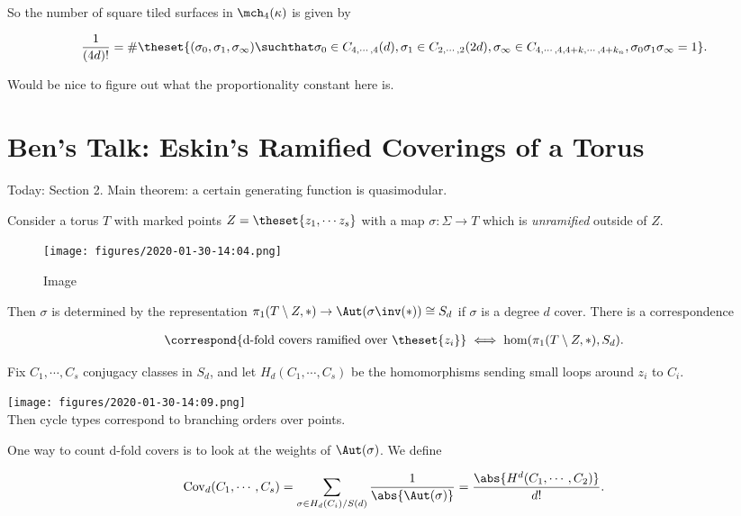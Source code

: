 So the number of square tiled surfaces in \(\mch_4(\kappa)\) is given by

\begin{align*}
\frac{1}{(4d)!} = \# \theset{ (\sigma_0, \sigma_1, \sigma_\infty) \suchthat \sigma_0 \in C_{4, \cdots, 4} (d), \sigma_1 \in C_{2, \cdots ,2} (2d), \sigma_{\infty} \in C_{4, \cdots ,4, 4+k, \cdots, 4 + k_n}, \sigma_0 \sigma_1 \sigma_\infty = 1}
.\end{align*}

Would be nice to figure out what the proportionality constant here is.

\hypertarget{bens-talk-eskins-ramified-coverings-of-a-torus}{%
\section{Ben's Talk: Eskin's Ramified Coverings of a
Torus}\label{bens-talk-eskins-ramified-coverings-of-a-torus}}

Today: Section 2. Main theorem: a certain generating function is
quasimodular.

Consider a torus \(T\) with marked points
\(Z = \theset{z_1, \cdots z_s}\) with a map \(\sigma: \Sigma \to T\)
which is \emph{unramified} outside of \(Z\).

\begin{figure}
\centering
\texttt{[image: figures/2020-01-30-14:04.png]}
\caption{Image}
\end{figure}

Then \(\sigma\) is determined by the representation
\(\pi_1(T\setminus Z, \ast) \to \Aut(\sigma\inv(\ast)) \cong S_d\) if
\(\sigma\) is a degree \(d\) cover. There is a correspondence

\begin{align*}
\correspond{\text{d-fold covers ramified over } \theset{z_i}} 
\iff
\hom(\pi_1(T\setminus Z, \ast), S_d)
.\end{align*}

Fix \(C_1, \cdots, C_s\) conjugacy classes in \(S_d\), and let
\(H_d(C_1, \cdots, C_s)\) be the homomorphisms sending small loops
around \(z_i\) to \(C_i\).

\texttt{[image: figures/2020-01-30-14:09.png]}\\

Then cycle types correspond to branching orders over points.

One way to count d-fold covers is to look at the weights of
\(\Aut(\sigma)\). We define

\begin{align*}
\mathrm{Cov}_d (C_1, \cdots, C_s) = \sum_{\sigma \in H_d(C_i) / S(d)} \frac{1}{\abs{\Aut(\sigma)}} = \frac{\abs{H^d(C_1, \cdots, C_2)}}{d!}
.\end{align*}

